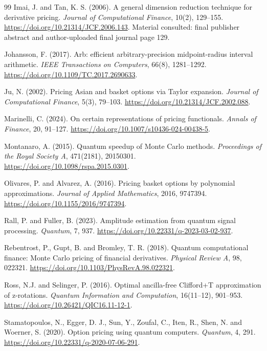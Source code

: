 \documentclass[11pt]{article}
\begin{document}
\begin{thebibliography}{99}
Imai, J. and Tan, K. S. (2006). A general dimension reduction technique for
derivative pricing. \emph{Journal of Computational Finance}, 10(2), 129--155.
\url{https://doi.org/10.21314/JCF.2006.143}. Material consulted: final publisher abstract and author-uploaded final journal page 129.

 Johansson, F. (2017). Arb: efficient arbitrary-precision midpoint-radius interval arithmetic. \emph{IEEE Transactions on Computers}, 66(8), 1281--1292. \url{https://doi.org/10.1109/TC.2017.2690633}.

Ju, N. (2002).
Pricing Asian and basket options via Taylor expansion.
\emph{Journal of Computational Finance}, 5(3), 79--103.
\url{https://doi.org/10.21314/JCF.2002.088}.

Marinelli, C. (2024). On certain representations of pricing functionals.
\emph{Annals of Finance}, 20, 91--127. \url{https://doi.org/10.1007/s10436-024-00438-5}.

 Montanaro, A. (2015). Quantum speedup of Monte Carlo methods. \emph{Proceedings of the Royal Society A}, 471(2181), 20150301. \url{https://doi.org/10.1098/rspa.2015.0301}.

 Olivares, P. and Alvarez, A. (2016). Pricing basket options by polynomial approximations. \emph{Journal of Applied Mathematics}, 2016, 9747394. \url{https://doi.org/10.1155/2016/9747394}.

 Rall, P. and Fuller, B. (2023). Amplitude estimation from quantum signal processing. \emph{Quantum}, 7, 937. \url{https://doi.org/10.22331/q-2023-03-02-937}.

 Rebentrost, P., Gupt, B. and Bromley, T. R. (2018). Quantum computational finance: Monte Carlo pricing of financial derivatives. \emph{Physical Review A}, 98, 022321. \url{https://doi.org/10.1103/PhysRevA.98.022321}.

Ross, N.J. and Selinger, P. (2016).
Optimal ancilla-free Clifford+T approximation of z-rotations.
\emph{Quantum Information and Computation}, 16(11--12), 901--953.
\url{https://doi.org/10.26421/QIC16.11-12-1}.

 Stamatopoulos, N., Egger, D. J., Sun, Y., Zoufal, C., Iten, R., Shen, N. and Woerner, S. (2020). Option pricing using quantum computers. \emph{Quantum}, 4, 291. \url{https://doi.org/10.22331/q-2020-07-06-291}.


\end{thebibliography}
\end{document}

